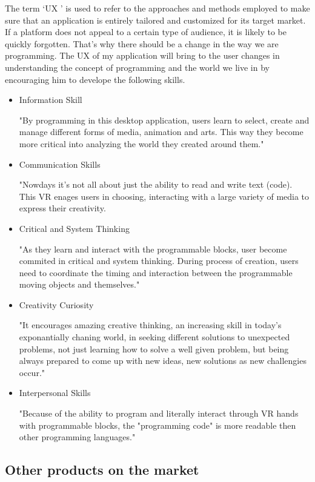 The term ‘UX ’ is used to refer to the approaches and methods employed to make sure that an application is entirely tailored and customized for its target market. If a platform does not appeal to a certain type of audience, it is likely to be quickly forgotten. That's why there should be a change in the way we are programming. The UX of my application will bring to the user changes in understanding the concept of programming and the world we live in by encouraging him to develope the following skills.

\begin{itemize}
\item{Information Skill}

"By programming in this desktop application, users learn to select, create and manage different forms of media, animation and arts. This way they become more critical into analyzing the world they created around them."
\item{Communication Skills}

"Nowdays it's not all about just the ability to read and write text (code). This VR enages users in choosing, interacting with a large variety of media to express their creativity.
 
\item{Critical and System Thinking}

"As they learn and interact with the programmable blocks, user become commited in critical and system thinking. During process of creation, users need to coordinate the timing and interaction between the programmable moving objects and themselves."

\item{Creativity Curiosity}

"It encourages amazing creative thinking, an  increasing skill in today's exponantially chaning world, in seeking different solutions to unexpected problems, not just learning how to solve a well given problem, but being always prepared to come up with new ideas, new solutions as new challengies occur."

\item{Interpersonal Skills}

"Because of the ability to program and literally interact through VR hands with programmable blocks, the "programming code" is more readable then other programming languages."

\end{itemize}

\subsection{Other products on the market}


